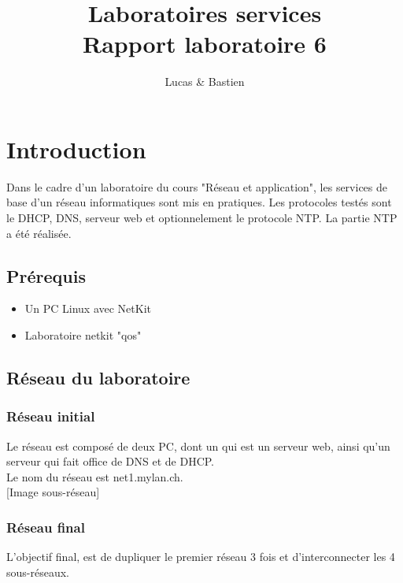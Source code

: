 \documentclass{article}
\title{%
	Laboratoires services \\
	\large Rapport laboratoire 6
}
\author{\bsc{Bulloni} Lucas \& \bsc{Wermeille} Bastien}
\begin{document}
\maketitle

\newpage

\tableofcontents

\newpage

\section{Introduction}
	
Dans le cadre d'un laboratoire du cours "Réseau et application", les services de base d'un réseau informatiques sont mis en pratiques. Les protocoles testés sont le DHCP, DNS, serveur web et optionnelement le protocole NTP. La partie NTP a été réalisée.

\subsection{Prérequis}

\begin{itemize}
	\item Un PC Linux avec NetKit
	\item Laboratoire netkit "qos"
\end{itemize}

\subsection{Réseau du laboratoire}

\subsubsection{Réseau initial}

Le réseau est composé de deux PC, dont un qui est un serveur web, ainsi qu'un serveur qui fait office de DNS et de DHCP.\\

Le nom du réseau est net1.mylan.ch.\\

[Image sous-réseau]

\subsubsection{Réseau final}

L'objectif final, est de dupliquer le premier réseau 3 fois et d'interconnecter les 4 sous-réseaux.\\
\end{document}
